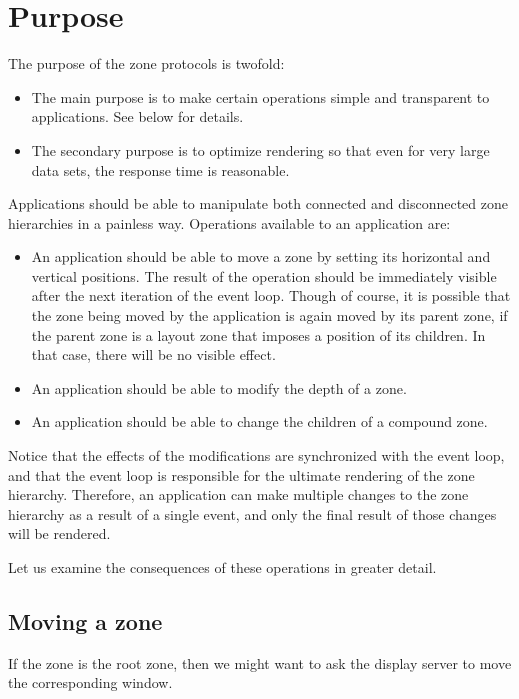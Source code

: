 \documentclass{report}
\begin{document}
\section{Purpose}

The purpose of the zone protocols is twofold:

\begin{itemize}
\item The main purpose is to make certain operations simple and
  transparent to applications.  See below for details.
\item The secondary purpose is to optimize rendering so that even for
  very large data sets, the response time is reasonable.
\end{itemize}

Applications should be able to manipulate both connected and
disconnected zone hierarchies in a painless way.  Operations available
to an application are:

\begin{itemize}
\item An application should be able to move a zone by setting its
  horizontal and vertical positions.  The result of the operation
  should be immediately visible after the next iteration of the event
  loop.  Though of course, it is possible that the zone being moved by
  the application is again moved by its parent zone, if the parent
  zone is a layout zone that imposes a position of its children.  In
  that case, there will be no visible effect.
\item An application should be able to modify the depth of a zone.  
\item An application should be able to change the children of a
  compound zone.
\end{itemize}

Notice that the effects of the modifications are synchronized with the
event loop, and that the event loop is responsible for the ultimate
rendering of the zone hierarchy.  Therefore, an application can make
multiple changes to the zone hierarchy as a result of a single event,
and only the final result of those changes will be rendered.  

Let us examine the consequences of these operations in greater
detail. 

\subsection{Moving a zone}

If the zone is the root zone, then we might want to ask the display
server to move the corresponding window. 
\end{document}
